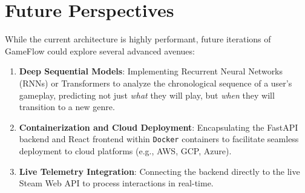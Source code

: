 \documentclass[12pt, a4paper]{report}
\begin{document}
\section{Future Perspectives}
While the current architecture is highly performant, future iterations of GameFlow could explore several advanced avenues:
\begin{enumerate}
    \item \textbf{Deep Sequential Models}: Implementing Recurrent Neural Networks (RNNs) or Transformers to analyze the chronological sequence of a user's gameplay, predicting not just \textit{what} they will play, but \textit{when} they will transition to a new genre.
    \item \textbf{Containerization and Cloud Deployment}: Encapsulating the FastAPI backend and React frontend within \texttt{Docker} containers to facilitate seamless deployment to cloud platforms (e.g., AWS, GCP, Azure).
    \item \textbf{Live Telemetry Integration}: Connecting the backend directly to the live Steam Web API to process interactions in real-time.
\end{enumerate}
\end{document}
